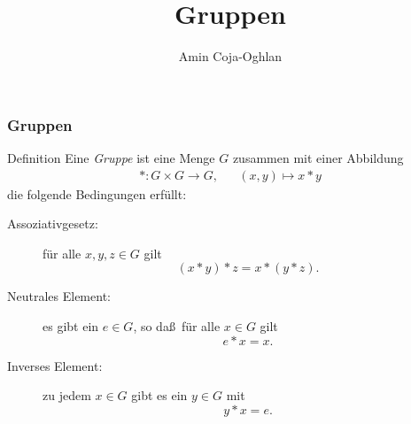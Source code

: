\documentclass{beamer}
\title[Linadi]{Gruppen}
\author[Amin Coja-Oghlan]{Amin Coja-Oghlan}
\institute[Frankfurt]{JWGUFFM}
\date{}
\renewcommand{\emph}[1]{{\textcolor{solarizedRed}{\itshape #1}}}
\newcommand{\ue}{\"u}
\begin{document}
\frame[plain]{\titlepage}

\begin{frame}\frametitle{Gruppen}
	\begin{block}{Definition}
		Eine \emph{Gruppe} ist eine Menge $G$ zusammen mit einer Abbildung 
		\begin{align*}
			*:G\times G\to G,&&(x,y)\mapsto x*y
		\end{align*}
 die folgende Bedingungen erf\"ullt:
		\begin{description}
			\item[Assoziativgesetz:] f\ue r alle $x,y,z\in G$ gilt $$(x*y)*z=x*(y*z).$$
			\item[Neutrales Element:] es gibt ein $e\in G$, so da\ss\ f\ue r alle $x\in G$ gilt $$e*x=x.$$
			\item[Inverses Element:] zu jedem $x\in G$ gibt es ein $y\in G$ mit $$y*x=e.$$
		\end{description}
	\end{block}
\end{frame}
\end{document}
